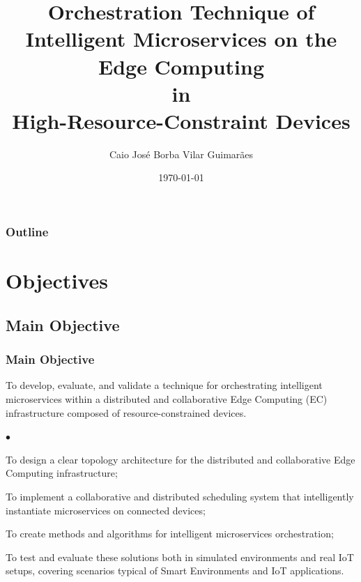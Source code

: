 \documentclass[tikz]{beamer}
\title{Orchestration Technique of Intelligent Microservices on the Edge Computing \\in \\ High-Resource-Constraint Devices}
\author{Caio Jos\'e Borba Vilar Guimar\~aes}
\institute{UFCG}
\date{\today}
\begin{document}
    

\begin{frame}
\titlepage
\end{frame}

\begin{frame}
    \frametitle{Outline}
    \tableofcontents
\end{frame}

\section{Objectives}
\subsection{Main Objective}
\begin{frame}
\frametitle{Main Objective}
To develop, evaluate, and validate a technique for orchestrating intelligent microservices within a distributed and collaborative Edge Computing (EC) infrastructure composed of resource-constrained devices.
    
\end{frame}

\begin{frame}
    \begin{list}{$\bullet$}{}
        \item To design a clear topology architecture for the distributed and collaborative Edge Computing infrastructure;
        \item To implement a collaborative and distributed scheduling system that intelligently instantiate microservices on connected devices;
        \item To create methods and algorithms for intelligent microservices orchestration;
        \item To test and evaluate these solutions both in simulated environments and real IoT setups, covering scenarios typical of Smart Environments and IoT applications.
    \end{list}

\end{frame}
\end{document}
